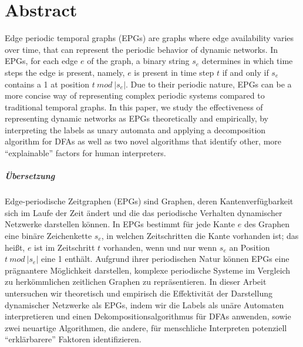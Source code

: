 \chapter*{Abstract}
Edge periodic temporal graphs (EPGs) are graphs where edge availability varies over time, that can represent the periodic behavior of dynamic networks.
In EPGs, for each edge $e$ of the graph, a binary string $s_e$ determines in which time steps the edge is present, namely, $e$ is present in time step $t$ if and only if $s_e$ contains a 1 at position $t~ mod~ |s_e|$.
Due to their periodic nature, EPGs can be a more concise way of representing complex periodic systems compared to traditional temporal graphs.
In this paper, we study the effectiveness of representing dynamic networks as EPGs theoretically and empirically, by interpreting the labels as unary automata and applying a decomposition algorithm for DFAs as well as two novel algorithms that identify other, more \enquote{explainable} factors for human interpreters.

\paragraph{Übersetzung}
Edge-periodische Zeitgraphen (EPGs)  sind Graphen, deren Kantenverfügbarkeit sich im Laufe der Zeit ändert und die das periodische Verhalten dynamischer Netzwerke darstellen können.
In EPGs bestimmt für jede Kante $e$ des Graphen eine binäre Zeichenkette $s_e$, in welchen Zeitschritten die Kante vorhanden ist; das heißt, $e$ ist im Zeitschritt $t$ vorhanden, wenn und nur wenn $s_e$ an Position $t~ mod~ |s_e|$ eine 1 enthält.
Aufgrund ihrer periodischen Natur können EPGs eine prägnantere Möglichkeit darstellen, komplexe periodische Systeme im Vergleich zu herkömmlichen zeitlichen Graphen zu repräsentieren. In dieser Arbeit untersuchen wir theoretisch und empirisch die Effektivität der Darstellung dynamischer Netzwerke als EPGs, indem wir die Labels als unäre Automaten interpretieren und einen Dekompositionsalgorithmus für DFAs anwenden, sowie zwei neuartige Algorithmen, die andere, für menschliche Interpreten potenziell \enquote{erklärbarere} Faktoren identifizieren.